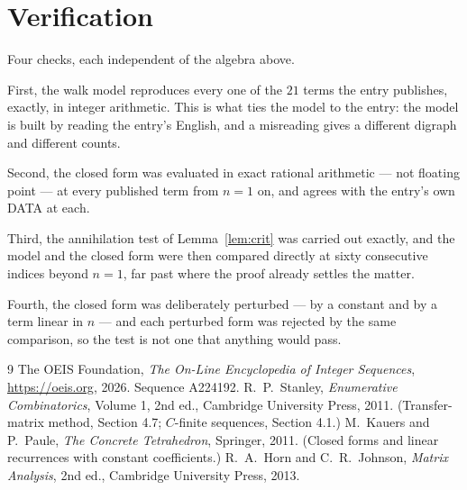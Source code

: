 \documentclass[11pt,a4paper]{article}
\theoremstyle{plain}
\theoremstyle{definition}
\begin{document}
\section{Verification}

Four checks, each independent of the algebra above.

First, the walk model reproduces every one of the $21$ terms the entry publishes,
exactly, in integer arithmetic. This is what ties the model to the entry: the model is built
by reading the entry's English, and a misreading gives a different digraph and different
counts.

Second, the closed form was evaluated in exact rational arithmetic --- not floating point ---
at every published term from $n=1$ on, and agrees with the entry's own DATA at each.

Third, the annihilation test of Lemma~\ref{lem:crit} was carried out exactly, and the model
and the closed form were then compared directly at sixty consecutive indices beyond
$n=1$, far past where the proof already settles the matter.

Fourth, the closed form was deliberately perturbed --- by a constant and by a term linear in
$n$ --- and each perturbed form was rejected by the same comparison, so the test is not one
that anything would pass.

\begin{thebibliography}{9}
 The OEIS Foundation, \emph{The On-Line Encyclopedia of Integer
Sequences}, \url{https://oeis.org}, 2026. Sequence A224192.
 R.~P.~Stanley, \emph{Enumerative Combinatorics}, Volume 1, 2nd ed.,
Cambridge University Press, 2011. (Transfer-matrix method, Section 4.7; $C$-finite sequences,
Section 4.1.)
 M.~Kauers and P.~Paule, \emph{The Concrete Tetrahedron}, Springer, 2011.
(Closed forms and linear recurrences with constant coefficients.)
 R.~A.~Horn and C.~R.~Johnson, \emph{Matrix Analysis}, 2nd ed., Cambridge
University Press, 2013.
\end{thebibliography}
\end{document}
